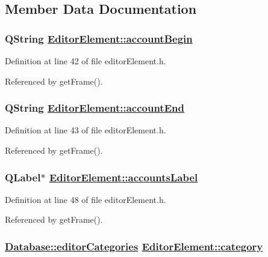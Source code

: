 \subsection{Member Data Documentation}
\hypertarget{classEditorElement_r6}{
\subsubsection[accountBegin]{\setlength{\rightskip}{0pt plus 5cm}QString \hyperlink{classEditorElement_r6}{Editor\-Element::account\-Begin}}}
\label{classEditorElement_r6}


Definition at line 42 of file editor\-Element.h.

Referenced by get\-Frame().\hypertarget{classEditorElement_r7}{
\subsubsection[accountEnd]{\setlength{\rightskip}{0pt plus 5cm}QString \hyperlink{classEditorElement_r7}{Editor\-Element::account\-End}}}
\label{classEditorElement_r7}


Definition at line 43 of file editor\-Element.h.

Referenced by get\-Frame().\hypertarget{classEditorElement_r11}{
\subsubsection[accountsLabel]{\setlength{\rightskip}{0pt plus 5cm}QLabel$\ast$ \hyperlink{classEditorElement_r11}{Editor\-Element::accounts\-Label}}}
\label{classEditorElement_r11}


Definition at line 48 of file editor\-Element.h.

Referenced by get\-Frame().\hypertarget{classEditorElement_r0}{
\subsubsection[category]{\setlength{\rightskip}{0pt plus 5cm}\hyperlink{classDatabase_w8}{Database::editor\-Categories} \hyperlink{classEditorElement_r0}{Editor\-Element::category}}}
\label{classEditorElement_r0}


